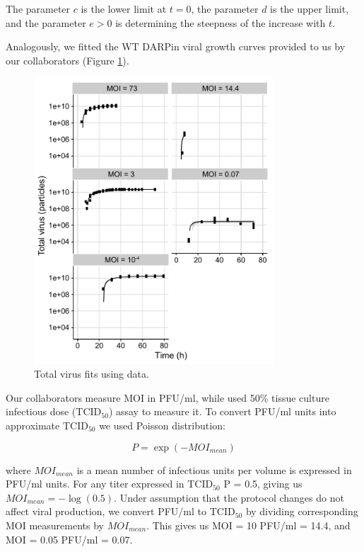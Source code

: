 The parameter $c$ is the lower limit at $t=0$, the parameter $d$ is the upper limit, and the parameter $e>0$ is determining the steepness of the increase with $t$.

Analogously, we fitted the WT DARPin viral growth curves provided to us by our collaborators \cite{DarpinData} (Figure \ref{figure:totalVirusFits}).

\begin{figure}
\begin{center}
\includegraphics[width=0.8\textwidth, trim={0cm 0cm 0cm 0cm}, clip]{D_chapters/3_DARPinModels/fittingTotalVirus.pdf}
\caption[Total virus fits]{Total virus fits using \cite{rudiger2019multiscale, DarpinData} data.}
\label{figure:totalVirusFits}
\end{center}
\end{figure}

Our collaborators measure MOI in PFU/ml, while \cite{rudiger2019multiscale} used 50\% tissue culture infectious dose (TCID$_50$) assay to measure it. To convert PFU/ml units into approximate TCID$_50$ we used Poisson distribution:

\begin{equation}
P = \exp(-MOI_{mean})
\end{equation}

where $MOI_{mean}$ is a mean number of infectious units per volume is expressed in PFU/ml units. For any titer expressed in TCID$_{50}$ P = 0.5, giving us $MOI_{mean} = -\log(0.5)$. Under assumption that the protocol changes do not affect viral production, we convert PFU/ml to TCID$_{50}$ by dividing corresponding MOI measurements by $MOI_{mean}$. This gives us MOI = 10 PFU/ml = 14.4, and MOI = 0.05 PFU/ml = 0.07.

